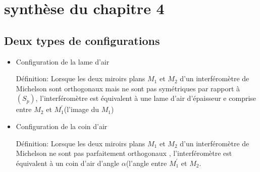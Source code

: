 \documentclass[a4paper,12pt]{book}
\begin{document}
\renewcommand{\labelitemi}{$\blacktriangleright$}
\renewcommand{\labelitemii}{$\bullet$}


\section{synthèse du chapitre 4}
\subsection{Deux types de configurations}
\begin{itemize}
    \item Configuration de la lame d'air
    
    Définition: Lorsque les deux miroirs plans $M_1$ et $M_2$ d'un interféromètre de Michelson sont orthogonaux mais ne 
    sont pas symétriques par rapport à $(S_p)$, l'interféromètre est équivalent à une lame d'air 
    d'épaisseur e comprise entre $M_2$ et $M_1^{'}$(l'image du $M_1$)

    \item Configuration de la coin d'air
    
    Définition: Lorsque les deux miroirs plans $M_1$ et $M_2$ d'un interféromètre de Michelson ne sont pas parfaitement
    orthogonaux , l'interféromètre est équivalent à un coin d'air d'angle $\alpha$(l'angle entre $M_1^{'}$ et $M_2$.
\end{itemize}
\end{document}
